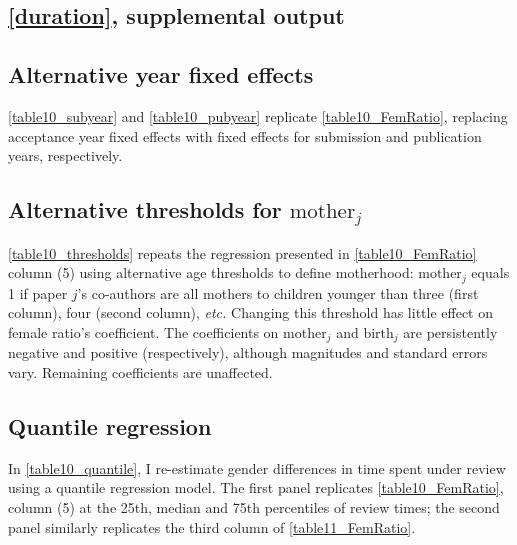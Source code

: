 \begin{appendices}
\begin{refsection}

\clearpage


\section{\autoref{duration}, supplemental output}
\label{appendixduration}

\subsection{Alternative year fixed effects}
\label{appendixalternativeyear}

\autoref{table10_subyear} and \autoref{table10_pubyear} replicate \autoref{table10_FemRatio}, replacing acceptance year fixed effects with fixed effects for submission and publication years, respectively.




\clearpage


\subsection{Alternative thresholds for $\text{mother}_j$}
\label{appendixmotherhood}

\autoref{table10_thresholds} repeats the regression pre\-sented in \autoref{table10_FemRatio} column (5) using alternative age thresholds to define motherhood: $\text{mother}_j$ equals 1 if paper $j$'s co-authors are all mothers to children younger than three (first column), four (second column), \emph{etc.} Changing this threshold has little effect on female ratio's coefficient. The coefficients on $\text{mother}_j$ and $\text{birth}_j$ are persistently negative and positive (respectively), although magnitudes and standard errors vary. Remaining coefficients are unaffected.



\clearpage


\subsection{Quantile regression}
\label{appendixquantile}

In \autoref{table10_quantile}, I re-estimate gender differences in time spent under review using a quantile regression model. The first panel replicates \autoref{table10_FemRatio}, column (5) at the 25th, median and 75th percentiles of review times; the second panel similarly replicates the third column of \autoref{table11_FemRatio}.


\end{refsection}
\end{appendices}
